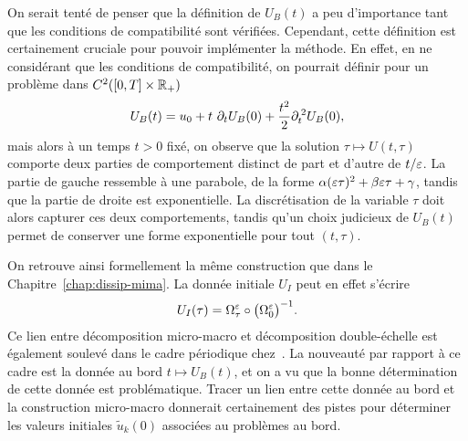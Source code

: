 \begin{FRremark}
    On serait tenté de penser que la définition de $U_B(t)$ a peu d'importance tant que les conditions de compatibilité sont vérifiées. Cependant, cette définition est certainement cruciale pour pouvoir implémenter la méthode. En effet, en ne considérant que les conditions de compatibilité, on pourrait définir pour un problème dans $C^2([0,T] \times \mathbb{R}_+)$
    \begin{equation*}
        U_B(t) = u_0 + t\ \partial_t U_B(0) 
            + \frac{t^2}{2} \partial_t ^{\:2} U_B(0) ,
    \end{equation*}
    mais alors à un temps $t > 0$ fixé, on observe que la solution $\tau \mapsto U(t,\tau)$ comporte deux parties de comportement distinct de part et d'autre de $t/\varepsilon$. La partie de gauche ressemble à une parabole, de la forme $\alpha (\varepsilon\tau)^2 + \beta\varepsilon\tau + \gamma$, tandis que la partie de droite est exponentielle. La discrétisation de la variable $\tau$ doit alors capturer ces deux comportements, tandis qu'un choix judicieux de $U_B(t)$ permet de conserver une forme exponentielle pour tout $(t,\tau)$. 
\end{FRremark}

On retrouve ainsi formellement la même construction que dans le Chapitre~\ref{chap:dissip-mima}. La donnée initiale $U_I$ peut en effet s'écrire  
\begin{equation*}
    U_I(\tau) = \Omega^{\varepsilon}_\tau \circ \big( \Omega^{\varepsilon} _0 \big)^{-1} .
\end{equation*}
Ce lien entre décomposition micro-macro et décomposition double-échelle est également soulevé dans le cadre périodique chez~\cite{chartier.2020.derivative}. La nouveauté par rapport à ce cadre est la donnée au bord $t \mapsto U_B(t)$, et on a vu que la bonne détermination de cette donnée est problématique. Tracer un lien entre cette donnée au bord et la construction micro-macro donnerait certainement des pistes pour déterminer les valeurs initiales $\widetilde{u}_k(0)$ associées au problèmes au bord. 